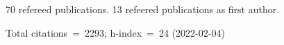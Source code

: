 70 refereed publications. 13 refeered publications as first author.

Total citations~=~2293; h-index~=~24 (2022-02-04)